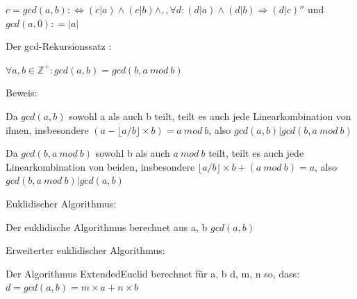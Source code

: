 \documentclass[a4paper]{article}
\begin{document}
\begin{multicols}{3}
      \begin{itemize*}
            \item $c = gcd(a, b) :\Leftrightarrow ( c | a)
                  \wedge ( c | b) \wedge
                  ,,\forall d: ( d | a ) \wedge (
                  d | b) \Rightarrow ( d | c )''$ und
            $gcd(a, 0 ) : = | a |$
            \item Der gcd-Rekursionssatz :
            \begin{itemize*}
                  \item $\forall a, b \in \mathbb{Z}^+: gcd(a, b) = gcd(b, a\ mod\ b)$
                  \item Beweis:
                  \begin{itemize*} \item Da $gcd(a, b)$ sowohl a als auch b teilt, teilt es auch jede Linearkombination von ihnen, insbesondere $(a- \lfloor a / b \rfloor \times b) = a\ mod\ b$, also $gcd(a, b) | gcd(b, a\ mod\ b)$ \item Da $gcd(b, a\ mod\ b)$ sowohl b als auch $a\ mod\ b$ teilt, teilt es auch jede Linearkombination von beiden, insbesondere $\lfloor a / b \rfloor \times b + (a\ mod\ b) = a$, also $gcd(b, a\ mod\ b) | gcd(a, b)$ \end{itemize*}
            \end{itemize*}
            \item Euklidischer Algorithmus:
            \begin{itemize*}
                  \item Der euklidische Algorithmus berechnet aus a, b $gcd(a, b)$
            \end{itemize*}
            \item Erweiterter euklidischer Algorithmus:
            \begin{itemize*}
                  \item Der Algorithmus ExtendedEuclid berechnet für a, b d, m, n so, dass: $d = gcd(a, b) = m \times a + n \times b$

\end{itemize*}
\end{itemize*}
\end{multicols}
\end{document}
